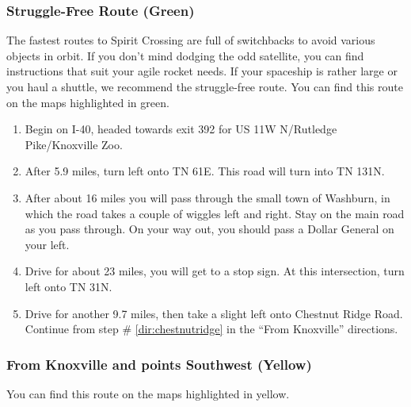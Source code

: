 \subsubsection*{Struggle-Free Route (Green)}
The fastest routes to Spirit Crossing are full of switchbacks to avoid various objects in orbit. If you don't mind dodging the odd satellite, you can find instructions that suit your agile rocket needs. If your spaceship is rather large or you haul a shuttle, we recommend the struggle-free route. You can find this route on the maps highlighted in green.

\begin{enumerate}[noitemsep]
	\item Begin on I-40, headed towards exit 392 for US 11W N/Rutledge Pike/Knoxville Zoo.
	\item After 5.9 miles, turn left onto TN 61E. This road will turn into TN 131N.
    \item After about 16 miles you will pass through the small town of Washburn, in which the road takes a couple of wiggles left and right. Stay on the main road as you pass through. On your way out, you should pass a Dollar General on your left.
    \item Drive for about 23 miles, you will get to a stop sign. At this intersection, turn left onto TN 31N.
    \item Drive for another 9.7 miles, then take a slight left onto Chestnut Ridge Road. Continue from step \# \ref{dir:chestnutridge} in the ``From Knoxville'' directions.
\end{enumerate}

\subsubsection*{From Knoxville and points Southwest (Yellow)}
You can find this route on the maps highlighted in yellow.

